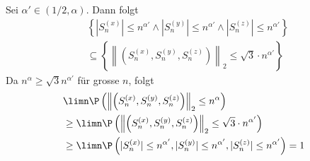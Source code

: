 Sei $\alpha' \in (1/2, \alpha)$. Dann folgt 
\begin{align*}
    &\left\{|S_n^{(x)}| \leq n^{\alpha'} \land |S_n^{(y)}| \leq n^{\alpha'} \land |S_n^{(z)}| \leq n^{\alpha'}\right\} \\
    &\subseteq \left\{\left\lVert\left(S_n^{(x)}, S_n^{(y)}, S_n^{(z)}\right)\right\rVert_2 \leq \sqrt{3} \cdot n^{\alpha'}\right\}
\end{align*}
Da $n^\alpha \geq \sqrt{3}n^{\alpha'}$ für grosse $n$, folgt
\begin{align*}
    &\limn \P\left(\left\lVert\left(S_n^{(x)}, S_n^{(y)}, S_n^{(z)}\right)\right\rVert_2 \leq n^\alpha\right)\\
     &\geq \limn \P\left(\left\lVert\left(S_n^{(x)}, S_n^{(y)}, S_n^{(z)}\right)\right\rVert_2 \leq \sqrt{3} \cdot n^{\alpha'}\right)\\
     &\geq \limn \P\left(|S_n^{(x)}| \leq n^{\alpha'}, |S_n^{(y)}| \leq n^{\alpha'}, |S_n^{(z)}| \leq n^{\alpha'}\right) = 1
\end{align*}